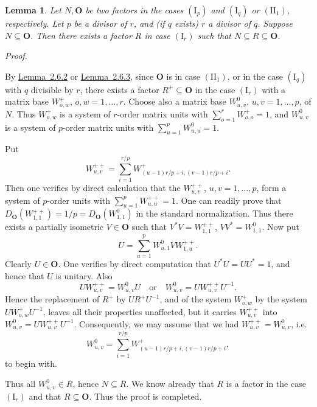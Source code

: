 \documentclass[b5paper,twoside]{article}
\newcommand{\lemref}[2]{\hyperref[#1]{\mbox{Lemma~#2}}}
\theoremstyle{mvnplain}
\newtheorem{lemma}{Lemma}[section]
\renewenvironment{proof}[1][Proof]{%
  \par\addvspace{0.35\baselineskip}%
  \noindent\textit{#1.}\ \normalfont\ignorespaces
}{%
  \par\addvspace{0.35\baselineskip}%
}
\newcommand{\N}{\mathbf N}
\newcommand{\R}{\mathbf R}
\def\N{N}%
\def\R{R}%
\begin{document}
\begin{lemma}\label{lem:4.4.2}
Let \(\N,\mathbf O\) be two factors in the cases \((\mathrm I_p)\) and
\((\mathrm I_q)\) or \((\mathrm{II}_1)\), respectively. Let \(p\) be a divisor
of \(r\), and (if \(q\) exists) \(r\) a divisor of \(q\). Suppose
\(\N\subseteq\mathbf O\). Then there exists a factor \(\R\) in case
\((\mathrm I_r)\) such that \(\N\subseteq\R\subseteq\mathbf O\).
\end{lemma}

\begin{proof}
By \lemref{lem:2.6.2}{2.6.2} or \lemref{lem:2.6.3}{2.6.3}, since
\(\mathbf O\) is in case \((\mathrm{II}_1)\), or in the case
\((\mathrm I_q)\) with \(q\) divisible by \(r\), there exists a factor
\(\R^+\subseteq\mathbf O\) in the case \((\mathrm I_r)\) with a matrix base
\(W^+_{o,w}\), \(o,w=1,\ldots,r\). Choose also a matrix base
\(W^0_{u,v}\), \(u,v=1,\ldots,p\), of \(\N\). Thus \(W^+_{o,w}\) is a
system of \(r\)-order matrix units with \(\sum_{o=1}^{r}W^+_{o,o}=1\), and
\(W^0_{u,v}\) is a system of \(p\)-order matrix units with
\(\sum_{u=1}^{p}W^0_{u,u}=1\).

Put
\begin{equation}\tag{4.4.\(\delta\)}\label{eq:4.4-delta}
 W^{++}_{u,v}=\sum_{i=1}^{r/p}
 W^+_{(u-1)r/p+i,(v-1)r/p+i}.
\end{equation}
Then one verifies by direct calculation that the \(W^{++}_{u,v}\),
\(u,v=1,\ldots,p\), form a system of \(p\)-order units with
\(\sum_{u=1}^{p}W^{++}_{u,u}=1\). One can readily prove that
\(D_{\mathbf O}(W^{++}_{1,1})=1/p=D_{\mathbf O}(W^0_{1,1})\) in the standard
normalization. Thus there exists a partially isometric \(V\in\mathbf O\) such
that \(V^*V=W^{++}_{1,1}\), \(VV^*=W^0_{1,1}\). Now put
\[
 U=\sum_{u=1}^{p}W^0_{u,1}VW^{++}_{1,u}.
\]
Clearly \(U\in\mathbf O\). One verifies by direct computation that
\(U^*U=UU^*=1\), and hence that \(U\) is unitary. Also
\begin{equation}\tag{4.4.\(\epsilon\)}\label{eq:4.4-epsilon}
 UW^{++}_{u,v}=W^0_{u,v}U
 \quad\text{or}\quad
 W^0_{u,v}=UW^{++}_{u,v}U^{-1}.
\end{equation}
Hence the replacement of \(\R^+\) by \(U\R^+U^{-1}\), and of the system
\(W^+_{o,w}\) by the system \(UW^+_{o,w}U^{-1}\), leaves all their
properties unaffected, but it carries \(W^{++}_{u,v}\) into
\(W^0_{u,v}=UW^{++}_{u,v}U^{-1}\). Consequently, we may assume that we
had \(W^{++}_{u,v}=W^0_{u,v}\), i.e.
\begin{equation}\tag{4.4.\(\zeta\)}\label{eq:4.4-zeta}
 W^0_{u,v}=\sum_{i=1}^{r/p}
 W^+_{(u-1)r/p+i,(v-1)r/p+i},
\end{equation}
to begin with.

Thus all \(W^0_{u,v}\in\R\), hence \(\N\subseteq\R\). We know already that
\(\R\) is a factor in the case \((\mathrm I_r)\) and that
\(\R\subseteq\mathbf O\). Thus the proof is completed.
\end{proof}
\end{document}
